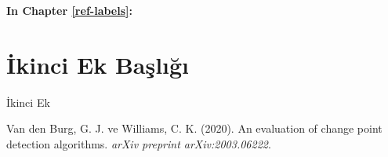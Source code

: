 \documentclass[12pt,twoside]{deuthesis}
\begin{document}
\textbf{In Chapter \ref{ref-labels}:}

\hypertarget{ikinci-ek-baux15flux131ux11fux131}{%
\chapter{İkinci Ek Başlığı}\label{ikinci-ek-baux15flux131ux11fux131}}

İkinci Ek

\hypertarget{refs}{}
\begin{CSLReferences}{1}{0}
\leavevmode{}%
Van den Burg, G. J. ve Williams, C. K. (2020). An evaluation of change point detection algorithms. \emph{arXiv preprint arXiv:2003.06222}.

\end{CSLReferences}
\end{document}
